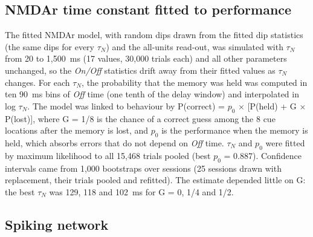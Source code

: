 \documentclass[11pt]{article}
\begin{document}
\subsection{NMDAr time constant fitted to performance}

The fitted NMDAr model, with random dips drawn from the fitted dip statistics (the same dips for every $\tau_N$) and the all-units read-out, was simulated with $\tau_N$ from 20 to 1,500~ms (17 values, 30,000 trials each) and all other parameters unchanged, so the \emph{On/Off} statistics drift away from their fitted values as $\tau_N$ changes. For each $\tau_N$, the probability that the memory was held was computed in ten 90~ms bins of \emph{Off} time (one tenth of the delay window) and interpolated in log $\tau_N$. The model was linked to behaviour by P(correct) = $p_0$ $\times$ [P(held) + G $\times$ P(lost)], where G = 1/8 is the chance of a correct guess among the 8 cue locations after the memory is lost, and $p_0$ is the performance when the memory is held, which absorbs errors that do not depend on \emph{Off} time. $\tau_N$ and $p_0$ were fitted by maximum likelihood to all 15,468 trials pooled (best $p_0$ = 0.887). Confidence intervals came from 1,000 bootstraps over sessions (25 sessions drawn with replacement, their trials pooled and refitted). The estimate depended little on G: the best $\tau_N$ was 129, 118 and 102~ms for G = 0, 1/4 and 1/2.

\subsection{Spiking network}
\end{document}
